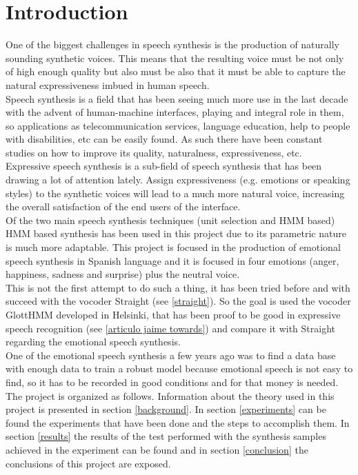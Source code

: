 \section{Introduction}\label{introduction}
One of the biggest challenges in speech synthesis is the production of naturally sounding synthetic voices. This means that the resulting voice must be not only of high enough quality but also must be also that it must be able to capture the natural expressiveness imbued in human speech.\\
Speech synthesis is a field that has been seeing much more use in the last decade with the advent of human-machine interfaces, playing and integral role in them, so applications as telecommunication services, language education, help to people with disabilities, etc can be easily found. As such there have been constant studies on how to improve its quality, naturalness, expressiveness, etc.\\
Expressive speech synthesis is a sub-field of speech synthesis that has been drawing a lot of attention lately. Assign expressiveness (e.g. emotions or speaking styles) to the synthetic voices will lead to a much more natural voice, increasing the overall satisfaction of the end users of the interface.\\
Of the two main speech synthesis techniques (unit selection \cite{emospeech} and HMM based) HMM based synthesis has been used in this project due to its parametric nature is much more adaptable.
This project is focused in the production of emotional speech synthesis in Spanish language and it is focused in four emotions (anger, happiness, sadness and surprise) plus the neutral voice.\\
This is not the first attempt to do such a thing, it has been tried before and with succeed with the vocoder Straight (see \ref{straight}). So the goal is used the vocoder GlottHMM developed in Helsinki, that has been proof to be good in expressive speech recognition (see \ref{articulo jaime towards}) and compare it with Straight regarding the emotional speech synthesis. \\
One of the emotional speech synthesis a few years ago was to find a data base with enough data to train a robust model because emotional speech is not easy to find, so it has to be recorded in good conditions and for that money is needed.\\
The project is organized as follows. Information about the theory used in this project is presented in section \ref{background}. In section \ref{experiments} can be found the experiments that have been done and the steps to accomplish them. In section \ref{results} the results of the test performed with the synthesis samples achieved in the experiment can be found and in section \ref{conclusion} the conclusions of this project are exposed.